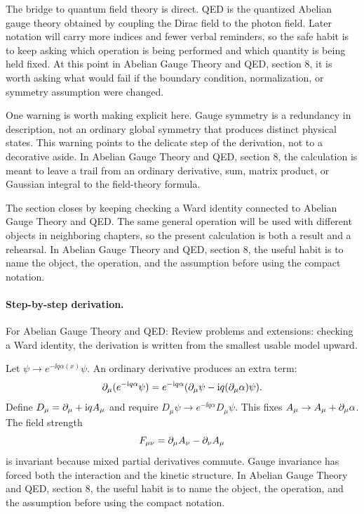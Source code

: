 The bridge to quantum field theory is direct.  QED is the quantized Abelian gauge theory obtained by coupling the Dirac field to the photon field.  Later notation will carry more indices and fewer verbal reminders, so the safe habit is to keep asking which operation is being performed and which quantity is being held fixed.  At this point in Abelian Gauge Theory and QED, section 8, it is worth asking what would fail if the boundary condition, normalization, or symmetry assumption were changed.

One warning is worth making explicit here.  Gauge symmetry is a redundancy in description, not an ordinary global symmetry that produces distinct physical states.  This warning points to the delicate step of the derivation, not to a decorative aside.  In Abelian Gauge Theory and QED, section 8, the calculation is meant to leave a trail from an ordinary derivative, sum, matrix product, or Gaussian integral to the field-theory formula.

The section closes by keeping checking a Ward identity connected to Abelian Gauge Theory and QED.  The same general operation will be used with different objects in neighboring chapters, so the present calculation is both a result and a rehearsal.  In Abelian Gauge Theory and QED, section 8, the useful habit is to name the object, the operation, and the assumption before using the compact notation.



\paragraph{Step-by-step derivation.}

For Abelian Gauge Theory and QED: Review problems and extensions: checking a Ward identity, the derivation is written from the smallest usable model upward.

Let \(\psi\to e^{-\ii q\alpha(x)}\psi\).  An ordinary derivative produces an extra term:
\[
  \partial_\mu(e^{-\mathrm i q\alpha}\psi)
  =
  e^{-\mathrm i q\alpha}(\partial_\mu\psi-\mathrm i q(\partial_\mu\alpha)\psi).
\]
Define \(D_\mu=\partial_\mu+\mathrm i qA_\mu\) and require \(D_\mu\psi\to e^{-\ii q\alpha}D_\mu\psi\).  This fixes \(A_\mu\to A_\mu+\partial_\mu\alpha\).  The field strength
\[
  F_{\mu\nu}=\partial_\mu A_\nu-\partial_\nu A_\mu
\]
is invariant because mixed partial derivatives commute.  Gauge invariance has forced both the interaction and the kinetic structure.  In Abelian Gauge Theory and QED, section 8, the useful habit is to name the object, the operation, and the assumption before using the compact notation.


